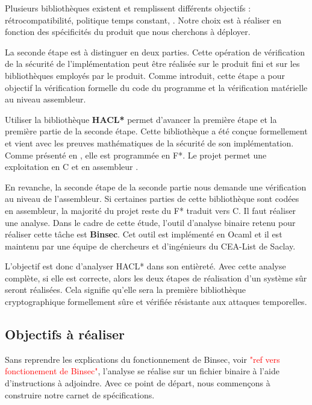 Plusieurs bibliothèques existent \cite{OpenSSL, BearSSL, polubelova2020haclxn} et remplissent différents objectifs :  rétrocompatibilité, politique temps constant, \etc. Notre choix est à réaliser en fonction des spécificités du produit que nous cherchons à déployer.\medbreak

La seconde étape est à distinguer en deux parties. Cette opération de vérification de la sécurité de l'implémentation peut être réalisée sur le produit fini et sur les bibliothèques employés par le produit. Comme introduit, cette étape a pour objectif la vérification formelle du code du programme et la vérification matérielle au niveau assembleur.\medbreak

Utiliser la bibliothèque \textbf{HACL*} \cite{polubelova2020haclxn, HACL*} permet d'avancer la première étape et la première partie de la seconde étape. Cette bibliothèque a été conçue formellement et vient avec les preuves mathématiques de la sécurité de son implémentation. Comme présenté en , elle est programmée en F*. Le projet permet une exploitation en C et en assembleur \cite{HACL*}.\medbreak

En revanche, la seconde étape de la seconde partie nous demande une vérification au niveau de l'assembleur. Si certaines parties de cette bibliothèque sont codées en assembleur, la majorité du projet reste du F* traduit vers C. Il faut réaliser une analyse. Dans le cadre de cette étude, l'outil d'analyse binaire retenu pour réaliser cette tâche est \textbf{Binsec}. Cet outil est implémenté en Ocaml et il est maintenu par une équipe de chercheurs et d'ingénieurs du CEA-List de Saclay.\medbreak

L'objectif est donc d'analyser HACL* dans son entièreté. Avec cette analyse complète, si elle est correcte, alors les deux étapes de réalisation d'un système sûr seront réalisées. Cela signifie qu'elle sera la première bibliothèque cryptographique formellement sûre et vérifiée résistante aux attaques temporelles.

\subsection*{Objectifs à réaliser}

Sans reprendre les explications du fonctionnement de Binsec, voir \textcolor{red}{"ref vers fonctionement de Binsec"}, l'analyse se réalise sur un fichier binaire à l'aide d'instructions à adjoindre. Avec ce point de départ, nous commençons à construire notre carnet de spécifications.

